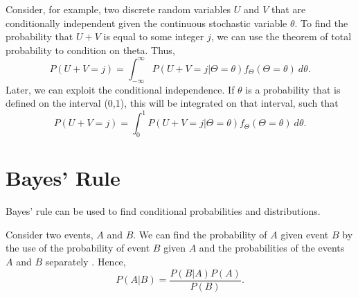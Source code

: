 Consider, for example, two discrete random variables $U$ and $V$ that are conditionally independent given the continuous stochastic variable $\theta$. To find the probability that $U+V$ is equal to some integer $j$, we can use the theorem of total probability to condition on theta. Thus,
\begin{equation*}
    P(U+V=j) = \int_{-\infty}^\infty P(U+V=j|\Theta=\theta)f_{\Theta}(\Theta=\theta) \: d\theta.
\end{equation*}
Later, we can exploit the conditional independence. If $\theta$ is a probability that is defined on the interval (0,1), this will be integrated on that interval, such that 
\begin{equation*}
    P(U+V=j) = \int_{0}^1 P(U+V=j|\Theta=\theta)f_{\Theta}(\Theta=\theta) \: d\theta.
\end{equation*}




\section{Bayes' Rule}
Bayes' rule can be used to find conditional probabilities and distributions. 
\begin{theorem}
Consider two events, $A$ and $B$. We can find the probability of $A$ given event $B$ by the use of the probability of event $B$ given $A$ and the probabilities of the events $A$ and $B$ separately \citep{statinf}. Hence,
\begin{equation}
\label{bayesrule}
    P(A|B)=\frac{P(B|A)P(A)}{P(B)}.
\end{equation}
\end{theorem}




\begin{comment}
From \citet{schay2016introduction}, we have a version of Bayes' theorem for continuous variables which is stated as 
\begin{theorem}[Bayes' Theorem]
\label{bayestheorem}
For a continuous random variable Y and any event A with nonzero probability, if $P(A|Y=y)$ and $f_Y$ exist for all $y$, then
\begin{equation}
    \label{bayestheorem_eq}
    f_{Y|A}(y) = \frac{P(A|Y=y)f_Y(y)}{\int_{-\infty}^{\infty}P(A|Y=y) f_Y(y) dy}.
\end{equation}
Here $f_Y$is called the prior density of $Y$, and $f_{Y|A}$ its posterior density, referring to the fact that these are the densities of $Y$ before and after the observation of $A$. 
\end{theorem}

From \eqref{lawoftotprob} we see that the denominator is the probability of event $A$, \begin{equation*}
    \int_{-\infty}^{\infty}P(A|Y=y) f_Y(y) = P(A),
\end{equation*}
such that Bayes' theorem can be stated as
\begin{equation}
    \label{bayestheorem_eq2}
    f_{Y|A}(y) = \frac{P(A|Y=y)f_Y(y)}{P(A)}.
\end{equation}


Or:
\end{comment}

